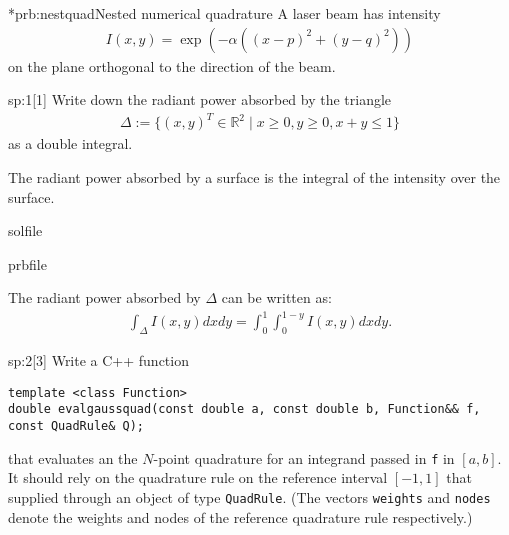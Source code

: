 
\begin{samproblem}*{prb:nestquad}{Nested numerical quadrature}{
  A laser beam has intensity
  \begin{align*}
    I(x,y) = \exp(- \alpha ((x-p)^2 + (y-q)^2) )
  \end{align*}
  on the plane orthogonal to the direction of the beam.
}
 
\begin{subproblem}{sp:1}[1]
  Write down the radiant power absorbed by the triangle
  \begin{align*}
    \Delta := \{(x,y)^T \in \mathbb{R}^2 \; | \; x \geq 0, y \geq 0, x+y \leq 1 \}
  \end{align*}
  as a double integral.
  
  \begin{samhint}
    The  radiant power absorbed by a surface is the integral of the intensity over the surface.
  \end{samhint}
  
  \begin{samwriteprbpart}{solfile}
    \begin{writeverbatim}{prbfile}
      \begin{samsolution}
        The radiant power absorbed by $\Delta$ can be written as:
        \begin{align*}
          \int_\Delta I(x,y) dx dy = \int_0^1 \int_0^{1-y} I(x,y) dx dy.
        \end{align*}
      \end{samsolution}
    \end{writeverbatim}
  \end{samwriteprbpart}

\end{subproblem}

\begin{subproblem}{sp:2}[3]
  Write a C++ function 
  \begin{lstlisting}[style=cpp]
template <class Function>
double evalgaussquad(const double a, const double b, Function&& f, const QuadRule& Q);
  \end{lstlisting}
  that evaluates an the $N$-point quadrature for an integrand passed in \texttt{f}
  in $[a,b]$. It should rely on the quadrature rule on the reference interval
  $[-1,1]$ that supplied through an object of type \texttt{QuadRule}. 
  (The vectors \verb|weights| and \verb|nodes| denote the weights and
  nodes of the reference quadrature rule respectively.)
  

\end{subproblem}
\end{samproblem}

